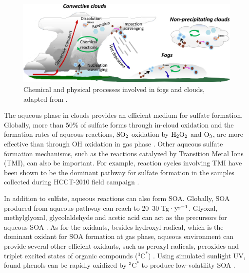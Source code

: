 \documentclass[edeposit,fullpage]{uiucthesis2009}
\begin{document}
\begin{figure}
	\centering
	\includegraphics[scale=1.0]{chap1_figs/thesis_chap1_fig4.jpeg}
	\caption{Chemical and physical processes involved in fogs and
          clouds, adapted from \cite{ervens2015modeling}.}
	\label{fig:chap1-aq-proc}
\end{figure}

The aqueous phase in clouds provides an efficient medium for sulfate
formation. Globally, more than 50\% of sulfate forms through in-cloud
oxidation and the formation rates of aqueous reactions, $\rm SO_2$
oxidation by $\rm H_2O_2$ and $\rm O_3$, are more effective than
through OH oxidation in gas phase \citep{kreidenweis2003modification,
  rasch2000description}. Other aqueous sulfate formation mechanisms,
such as the reactions catalyzed by Transition Metal Ions (TMI), can
also be important. For example, reaction cycles involving TMI have
been shown to be the dominant pathway for sulfate formation in the
samples collected during HCCT-2010 field campaign
\citep{harris2012sulfur, harris2013enhanced}.

In addition to sulfate, aqueous reactions can also form SOA. Globally,
SOA produced from aqueous pathway can reach to 20--30 Tg·$\rm
yr^{-1}$. Glyoxal, methylglyoxal, glycolaldehyde and acetic acid can
act as the precursors for aqueous SOA \citep{liu2012global}. As for
the oxidants, besides hydroxyl radical, which is the dominant oxidant
for SOA formation at gas phase, aqueous environment can provide
several other efficient oxidants, such as peroxyl radicals, peroxides
and triplet excited states of organic compounds ($^{3}\textrm{C}^*$)
\citep{mcneill2015aqueous, ervens2011secondary}. Using simulated
sunlight UV, \citet{smith2014secondary} found phenols can be rapidly
oxidized by $^{3}\textrm{C}^*$ to produce low-volatility SOA .
\end{document}
